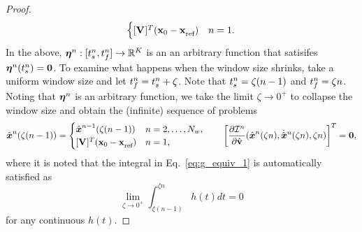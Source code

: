 \begin{proof}
\begin{equation*}
\begin{cases}
[\mathbf {V}^{}]^T( {{\mathbf{x}}_0} - \mathbf{x}_\text{ref}^{}) & n=1. \end{cases}  
\end{equation*}
In the above, $\boldsymbol \eta^{n}: [t_s^{n},t_f^{n}] \rightarrow \mathbb{R}^{K}$ is an an arbitrary function that satisifes $\boldsymbol \eta^{n}(t_s^{n}) = \boldsymbol 0$. 
To examine what happens when the window size shrinks, take a uniform window size and let $t_f^{n} = t_s^{n} + \zeta$. Note that $t_s^{n} = \zeta (n-1)$ and $t_f^{n} = \zeta n$. %
Noting that $\boldsymbol \eta^{n}$ is an arbitrary function, we take the limit $\zeta \rightarrow 0^+$ to collapse the window size and obtain the (infinite) sequence of problems
\begin{equation*}
 \genstateArg{n}{\zeta(n-1)} = 
\begin{cases}
\genstate^{n-1}(\zeta(n-1)) & n=2,\ldots,\nslabs,\\
\genstateIC & n=1, \end{cases} \qquad
\bigg[ \frac{\partial \minintegrandArg{n}}{\partial \genstateyDiscreteDot}(\genstateArg{n}{\zeta n},\genstateDotArg{n}{\zeta n},\zeta n) \bigg]^T= \boldsymbol 0,
\end{equation*}
where it is noted that the integral in Eq.~\eqref{eq:g_equiv_1} is automatically satisfied as
 \begin{equation*}
\lim_{\zeta \rightarrow 0^+}  \int_{\zeta (n-1)}^{\zeta n} h(t) dt = 0
\end{equation*}
for any continuous $h(t)$.

\end{proof}
